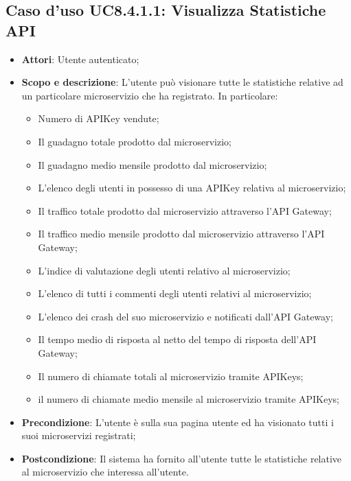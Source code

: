 \documentclass[12pt,a4paper,titlepage]{article}
\begin{document}
	\subsection{Caso d'uso UC8.4.1.1: Visualizza Statistiche API}
	\label{UC8.4.1.1}
	\begin{itemize}
		\item \textbf{Attori}: Utente autenticato;
		\item \textbf{Scopo e descrizione}: L'utente può visionare tutte le statistiche relative ad un particolare microservizio che ha registrato. In particolare:
		\begin{itemize}
			\item Numero di APIKey vendute;
			\item Il guadagno totale prodotto dal microservizio;
			\item Il guadagno medio mensile prodotto dal microservizio;
			\item L'elenco degli utenti in possesso di una APIKey relativa al microservizio;
			\item Il traffico totale prodotto dal microservizio attraverso l'API Gateway;
			\item Il traffico medio mensile prodotto dal microservizio attraverso l'API Gateway;
			\item L'indice di valutazione degli utenti relativo al microservizio;
			\item L'elenco di tutti i commenti degli utenti relativi al microservizio;
			\item L'elenco dei crash del suo microservizio e notificati dall'API Gateway;
			\item Il tempo medio di risposta al netto del tempo di risposta dell'API Gateway;
			\item Il numero di chiamate totali al microservizio tramite APIKeys;
			\item il numero di chiamate medio mensile al microservizio tramite APIKeys;
		\end{itemize}
		\item \textbf{Precondizione}: L'utente è sulla sua pagina utente ed ha visionato tutti i suoi microservizi registrati;
		\item \textbf{Postcondizione}: Il sistema ha fornito all'utente tutte le statistiche relative al microservizio che interessa all'utente.
	\end{itemize}
\end{document}

